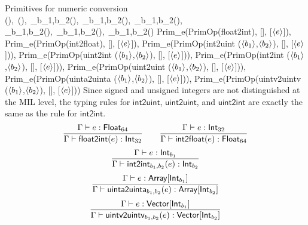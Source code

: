\documentclass[12pt,twoside,fleqn]{article}
\begin{document}
   {Primitives for numeric conversion}
   {(\expression),\ (\expression),\
    _{b_1,b_2}(\expression),\ 
    _{b_1,b_2}(\expression),\ 
    _{b_1,b_2}(\expression),$ $
    \mathsf{uint2uint}_{b_1,b_2}(\expression),\ 
    _{b_1,b_2}(\expression),\ 
    _{b_1,b_2}(\expression)}
   {Prim\_e(PrimOp(float2int), [], [$\langle{e}\rangle$]),
    Prim\_e(PrimOp(int2float), [], [$\langle{e}\rangle$]),
    Prim\_e(PrimOp(int2uint ($\langle{b_1}\rangle$,$\langle{b_2}\rangle$), [],
                   [$\langle{e}\rangle$])),
    Prim\_e(PrimOp(uint2int ($\langle{b_1}\rangle$,$\langle{b_2}\rangle$), [],
                   [$\langle{e}\rangle$])),
    Prim\_e(PrimOp(int2int ($\langle{b_1}\rangle$,$\langle{b_2}\rangle$), [],
                   [$\langle{e}\rangle$])),
    Prim\_e(PrimOp(uint2uint ($\langle{b_1}\rangle$,$\langle{b_2}\rangle$), [],
                   [$\langle{e}\rangle$])),
    Prim\_e(PrimOp(uinta2uinta ($\langle{b_1}\rangle$,$\langle{b_2}\rangle$), [],
                   [$\langle{e}\rangle$])),
    Prim\_e(PrimOp(uintv2uintv ($\langle{b_1}\rangle$,$\langle{b_2}\rangle$), [],
                   [$\langle{e}\rangle$]))}
   {}
   {Since signed and unsigned integers are not distinguished at the
    MIL level, the typing rules for $\mathsf{int2uint}$, $\mathsf{uint2uint}$, and
    $\mathsf{uint2int}$ are exactly the same as the rule for $\mathsf{int2int}$.}
   {\[
     \frac{\Gamma\vdash e : \mathsf{Float}_{64}}
          {\Gamma\vdash \mathsf{float2int}(e) : \mathsf{Int}_{32}}
     \qquad
     \frac{\Gamma\vdash e : \mathsf{Int}_{32}}
          {\Gamma\vdash \mathsf{int2float}(e) : \mathsf{Float}_{64}}
    \]
    \[
     \frac{\Gamma\vdash e : \mathsf{Int}_{b_1}}
          {\Gamma\vdash \mathsf{int2int}_{b_1,b_2}(e) : \mathsf{Int}_{b_2}}
    \]
    \[
     \frac{\Gamma\vdash e : \mathsf{Array}[\mathsf{Int}_{b_1}]}
          {\Gamma\vdash \mathsf{uinta2uinta}_{b_1,b_2}(e) : \mathsf{Array}[\mathsf{Int}_{b_2}]}
    \]
    \[
     \frac{\Gamma\vdash e : \mathsf{Vector}[\mathsf{Int}_{b_1}]}
          {\Gamma\vdash \mathsf{uintv2uintv}_{b_1,b_2}(e) : \mathsf{Vector}[\mathsf{Int}_{b_2}]}
    \]
   }
\end{document}
